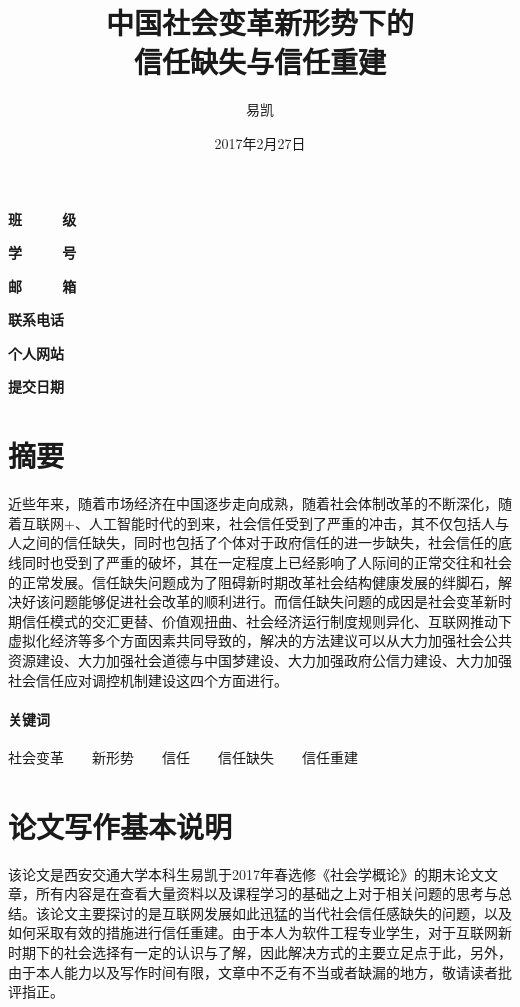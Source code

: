 \documentclass[UTF8]{ctexart}
\title{\Huge{中国社会变革新形势下的\\信任缺失与信任重建}}
\author{\Huge{易凯}}
\date{\Huge{2017年2月27日}}
\begin{document}
	\maketitle
	\vspace{35mm}
	\begin{flushright}
	\Large{
  	\textbf{班\ \ \ \ \ 级} 

  	\textbf{学\ \ \ \ \ 号} 

  	\textbf{邮\ \ \ \ \ 箱} 

  	\textbf{联系电话} 

  	\textbf{个人网站} 

  	\textbf{提交日期} 
  	}
  	\end{flushright}
  	\newpage
  	\tableofcontents
	\newpage

    \section{摘要}
    近些年来，随着市场经济在中国逐步走向成熟，随着社会体制改革的不断深化，随着互联网+、人工智能时代的到来，社会信任受到了严重的冲击，其不仅包括人与人之间的信任缺失，同时也包括了个体对于政府信任的进一步缺失，社会信任的底线同时也受到了严重的破坏，其在一定程度上已经影响了人际间的正常交往和社会的正常发展。信任缺失问题成为了阻碍新时期改革社会结构健康发展的绊脚石，解决好该问题能够促进社会改革的顺利进行。而信任缺失问题的成因是社会变革新时期信任模式的交汇更替、价值观扭曲、社会经济运行制度规则异化、互联网推动下虚拟化经济等多个方面因素共同导致的，解决的方法建议可以从大力加强社会公共资源建设、大力加强社会道德与中国梦建设、大力加强政府公信力建设、大力加强社会信任应对调控机制建设这四个方面进行。

    \paragraph{关键词}  社会变革\  \ \ \ 新形势\ \ \ \ 信任\ \ \ \  信任缺失\ \ \ \ 信任重建

    \section{论文写作基本说明}
    该论文是西安交通大学本科生易凯于2017年春选修《社会学概论》的期末论文文章，所有内容是在查看大量资料以及课程学习的基础之上对于相关问题的思考与总结。该论文主要探讨的是互联网发展如此迅猛的当代社会信任感缺失的问题，以及如何采取有效的措施进行信任重建。由于本人为软件工程专业学生，对于互联网新时期下的社会选择有一定的认识与了解，因此解决方式的主要立足点于此，另外，由于本人能力以及写作时间有限，文章中不乏有不当或者缺漏的地方，敬请读者批评指正。
\end{document}
